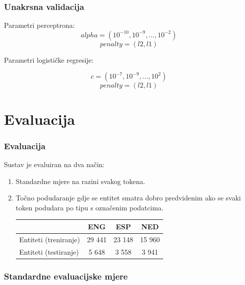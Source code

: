 \documentclass{beamer}
\begin{document}
\begin{frame}
\frametitle{Unakrsna validacija}
Parametri perceptrona: 
\[ alpha = (10^{-10}, 10^{-9}, ..., 10^{-2}) \]
\[ penalty = (l2, l1) \]

Parametri logističke regresije:

\[ c = (10^{-7}, 10^{-9}, ..., 10^{2}) \]
\[ penalty = (l2, l1) \]
\end{frame}

\section{Evaluacija}
\begin{frame}
\frametitle{Evaluacija}
Sustav je evaluiran na dva način:
\begin{enumerate}
\item Standardne mjere na razini svakog tokena.
\item Točno podudaranje gdje se entitet smatra dobro predvidenim ako se svaki token podudara po tipu s označenim podatcima.

\begin{center}
\begin{tabular}{ lccc }
\hline
 & ENG & ESP & NED \\ 
\hline
Entiteti (treniranje) & 29 441 & 23 148 & 15 960 \\
Entiteti (testiranje) & 5 648 & 3 558 & 3 941 \\
\hline
\end{tabular}
\end{center}
\end{enumerate}
\end{frame}
\note[]{

}

\begin{frame}
\frametitle{Standardne evaluacijske mjere}
\begin{center}
\end{center}
\end{frame}
\end{document}

